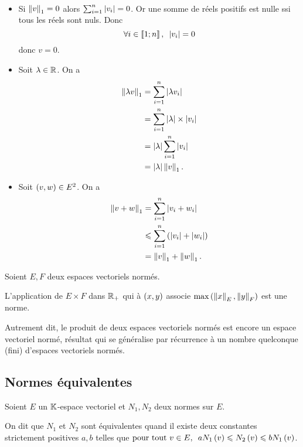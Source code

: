 \begin{dem}~\\
\begin{itemize}
    \item Si \(\norme{v}_1=0\) alors \(\sum_{i=1}^n\left\lvert v_i\right\rvert=0\). Or une somme de réels positifs est nulle ssi tous les réels sont nuls. Donc \[\quantifs{\forall i\in\interventierii{1}{n}}\abs{v_i}=0\] donc \(v=0\). \\
    \item Soit \(\lambda\in\mathbb{R}\). On a \[\begin{aligned}
        \norme{\lambda v}_1&=\sum_{i=1}^n\abs{\lambda v_i} \\
        &=\sum_{i=1}^n\abs{\lambda}\times\abs{v_i} \\
        &=\abs{\lambda}\sum_{i=1}^n\abs{v_i} \\
        &=\abs{\lambda}\norme{v}_1.
    \end{aligned}\]
    \item Soit \(\left(v,w\right)\in E^2\). On a \[\begin{aligned}
        \norme{v+w}_1&=\sum_{i=1}^n\abs{v_i+w_i} \\
        &\leq\sum_{i=1}^n\paren{\abs{v_i}+\abs{w_i}} \\
        &=\norme{v}_1+\norme{w}_1.
    \end{aligned}\]
\end{itemize}
\end{dem}

\begin{prop}
Soient \(E,F\) deux espaces vectoriels normés.

L'application de \(E\times F\) dans \(\mathbb{R}_+\) qui à \(\left(x,y\right)\) associe \(\max\paren{\norme{x}_E,\norme{y}_F}\) est une norme.

Autrement dit, le produit de deux espaces vectoriels normés est encore un espace vectoriel normé, résultat qui se généralise par récurrence à un nombre quelconque (fini) d'espaces vectoriels normés.
\end{prop}

\subsection{Normes équivalentes}

\begin{defi}
Soient \(E\) un \(\mathbb{K}\)-espace vectoriel et \(N_1,N_2\) deux normes sur \(E\).

On dit que \(N_1\) et \(N_2\) sont équivalentes quand il existe deux constantes strictement positives \(a,b\) telles que \(\quantifs{\tpt v\in E}aN_1\paren{v}\leq N_2\paren{v}\leq bN_1\paren{v}\).
\end{defi}

